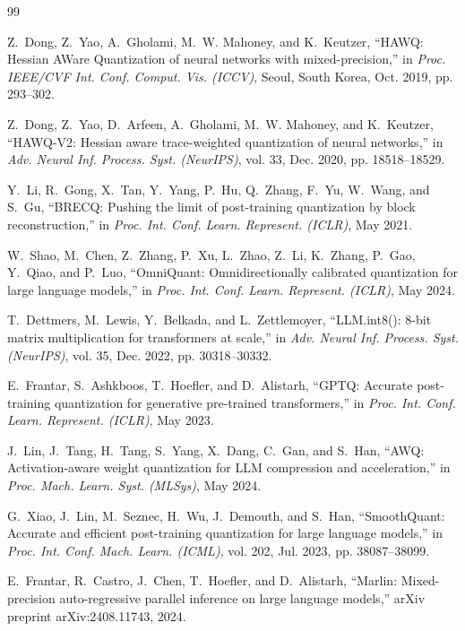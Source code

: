 \documentclass{ieeeaccess}
\begin{document}
\begin{thebibliography}{99}

Z.~Dong, Z.~Yao, A.~Gholami, M.~W. Mahoney, and K.~Keutzer,
``HAWQ: Hessian AWare Quantization of neural networks with mixed-precision,''
in \emph{Proc. IEEE/CVF Int. Conf. Comput. Vis. (ICCV)}, Seoul, South Korea, Oct. 2019, pp. 293--302.

Z.~Dong, Z.~Yao, D.~Arfeen, A.~Gholami, M.~W. Mahoney, and K.~Keutzer,
``HAWQ-V2: Hessian aware trace-weighted quantization of neural networks,''
in \emph{Adv. Neural Inf. Process. Syst. (NeurIPS)}, vol. 33, Dec. 2020, pp. 18518--18529.

Y.~Li, R.~Gong, X.~Tan, Y.~Yang, P.~Hu, Q.~Zhang, F.~Yu, W.~Wang, and S.~Gu,
``BRECQ: Pushing the limit of post-training quantization by block reconstruction,''
in \emph{Proc. Int. Conf. Learn. Represent. (ICLR)}, May 2021.

W.~Shao, M.~Chen, Z.~Zhang, P.~Xu, L.~Zhao, Z.~Li, K.~Zhang, P.~Gao, Y.~Qiao, and P.~Luo,
``OmniQuant: Omnidirectionally calibrated quantization for large language models,''
in \emph{Proc. Int. Conf. Learn. Represent. (ICLR)}, May 2024.

T.~Dettmers, M.~Lewis, Y.~Belkada, and L.~Zettlemoyer,
``LLM.int8(): 8-bit matrix multiplication for transformers at scale,''
in \emph{Adv. Neural Inf. Process. Syst. (NeurIPS)}, vol. 35, Dec. 2022, pp. 30318--30332.

E.~Frantar, S.~Ashkboos, T.~Hoefler, and D.~Alistarh,
``GPTQ: Accurate post-training quantization for generative pre-trained transformers,''
in \emph{Proc. Int. Conf. Learn. Represent. (ICLR)}, May 2023.

J.~Lin, J.~Tang, H.~Tang, S.~Yang, X.~Dang, C.~Gan, and S.~Han,
``AWQ: Activation-aware weight quantization for LLM compression and acceleration,''
in \emph{Proc. Mach. Learn. Syst. (MLSys)}, May 2024.

G.~Xiao, J.~Lin, M.~Seznec, H.~Wu, J.~Demouth, and S.~Han,
``SmoothQuant: Accurate and efficient post-training quantization for large language models,''
in \emph{Proc. Int. Conf. Mach. Learn. (ICML)}, vol. 202, Jul. 2023, pp. 38087--38099.

E.~Frantar, R.~Castro, J.~Chen, T.~Hoefler, and D.~Alistarh,
``Marlin: Mixed-precision auto-regressive parallel inference on large language models,''
arXiv preprint arXiv:2408.11743, 2024.


\end{thebibliography}
\end{document}
